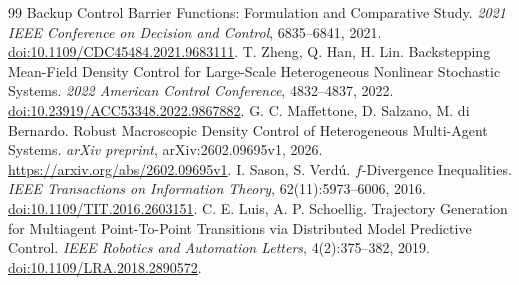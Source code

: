 \documentclass[UTF8,a4paper,11pt,fontset=none]{ctexart}
\begin{document}
\begin{thebibliography}{99}
Backup Control Barrier Functions: Formulation and Comparative Study.
\emph{2021 IEEE Conference on Decision and Control}, 6835--6841, 2021.
\href{https://doi.org/10.1109/CDC45484.2021.9683111}{doi:10.1109/CDC45484.2021.9683111}.
 T. Zheng, Q. Han, H. Lin.
Backstepping Mean-Field Density Control for Large-Scale Heterogeneous Nonlinear Stochastic Systems.
\emph{2022 American Control Conference}, 4832--4837, 2022.
\href{https://doi.org/10.23919/ACC53348.2022.9867882}{doi:10.23919/ACC53348.2022.9867882}.
 G. C. Maffettone, D. Salzano, M. di Bernardo.
Robust Macroscopic Density Control of Heterogeneous Multi-Agent Systems.
\emph{arXiv preprint}, arXiv:2602.09695v1, 2026.
\url{https://arxiv.org/abs/2602.09695v1}.
 I. Sason, S. Verd\'u.
$f$-Divergence Inequalities.
\emph{IEEE Transactions on Information Theory}, 62(11):5973--6006, 2016.
\href{https://doi.org/10.1109/TIT.2016.2603151}{doi:10.1109/TIT.2016.2603151}.
 C. E. Luis, A. P. Schoellig.
Trajectory Generation for Multiagent Point-To-Point Transitions via Distributed Model Predictive Control.
\emph{IEEE Robotics and Automation Letters}, 4(2):375--382, 2019.
\href{https://doi.org/10.1109/LRA.2018.2890572}{doi:10.1109/LRA.2018.2890572}.
\end{thebibliography}
\end{document}
